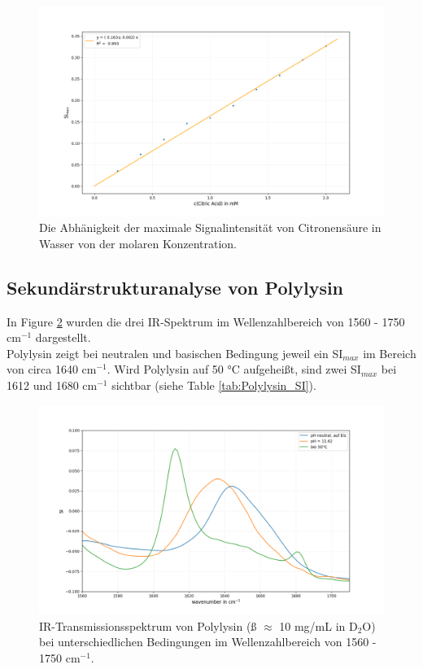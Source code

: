 \documentclass[10pt,a4paper]{article}
\begin{document}
		\begin{figure}[H]
			\centering
			\includegraphics[scale=0.55]{Standardcurve_Fit.png}
			\caption{Die Abhänigkeit der maximale Signalintensität von Citronensäure in Wasser von der molaren Konzentration. }
			\label{fig:Standardcurve}
		\end{figure}
		

		\subsection{Sekundärstrukturanalyse von Polylysin}
		
			In Figure \ref{fig:polylysin_IR_Spektrum} wurden die drei IR-Spektrum im Wellenzahlbereich von 1560 - 1750 cm$^{-1}$ dargestellt.\\
			Polylysin zeigt bei neutralen und basischen Bedingung jeweil ein SI$_{max}$ im Bereich von circa 1640 cm$^{-1}$. Wird Polylysin auf 50 °C aufgeheißt, sind zwei SI$_{max}$ bei 1612 und 1680 cm$^{-1}$ sichtbar (siehe Table \ref{tab:Polylysin_SI}).
				
			\begin{figure}[H]
				\centering
				\includegraphics[scale=0.55]{Polylysin.png}
				\caption{IR-Transmissionsspektrum von Polylysin (ß $\approx$ 10 mg/mL in D$_2$O) bei unterschiedlichen Bedingungen im Wellenzahlbereich von 1560 - 1750 cm$^{-1}$.}
				\label{fig:polylysin_IR_Spektrum}
			\end{figure}
			
\end{document}
